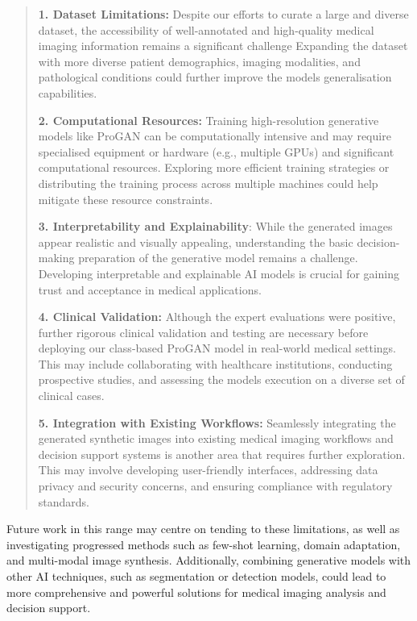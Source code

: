\documentclass[
]{article}
\begin{document}
\begin{quote}
\textbf{1. Dataset Limitations:} Despite our efforts to curate a large
and diverse dataset, the accessibility of well-annotated and
high-quality medical imaging information remains a significant challenge
Expanding the dataset with more diverse patient demographics, imaging
modalities, and pathological conditions could further improve the
model\textquotesingle s generalisation capabilities.

\textbf{2. Computational Resources:} Training high-resolution generative
models like ProGAN can be computationally intensive and may require
specialised equipment or hardware (e.g., multiple GPUs) and significant
computational resources. Exploring more efficient training strategies or
distributing the training process across multiple machines could help
mitigate these resource constraints.

\textbf{3. Interpretability and Explainability}: While the generated
images appear realistic and visually appealing, understanding the basic
decision-making preparation of the generative model remains a challenge.
Developing interpretable and explainable AI models is crucial for
gaining trust and acceptance in medical applications.

\textbf{4. Clinical Validation:} Although the expert evaluations were
positive, further rigorous clinical validation and testing are necessary
before deploying our class-based ProGAN model in real-world medical
settings. This may include collaborating with healthcare institutions,
conducting prospective studies, and assessing the
model\textquotesingle s execution on a diverse set of clinical cases.

\textbf{5. Integration with Existing Workflows:} Seamlessly integrating
the generated synthetic images into existing medical imaging workflows
and decision support systems is another area that requires further
exploration. This may involve developing user-friendly interfaces,
addressing data privacy and security concerns, and ensuring compliance
with regulatory standards.
\end{quote}

Future work in this range may centre on tending to these limitations, as
well as investigating progressed methods such as few-shot learning,
domain adaptation, and multi-modal image synthesis. Additionally,
combining generative models with other AI techniques, such as
segmentation or detection models, could lead to more comprehensive and
powerful solutions for medical imaging analysis and decision support.
\end{document}
